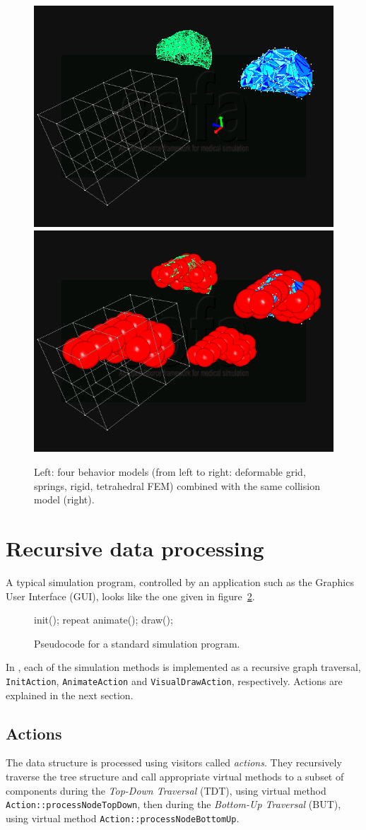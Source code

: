 \begin{figure}
 \centering
 \includegraphics[width=0.4\linewidth]{demoLiverFall1.png}
 \includegraphics[width=0.4\linewidth]{demoLiverFall2.png}
 \caption{Left: four behavior models (from left to right: deformable grid, springs, rigid, tetrahedral FEM) combined with the same collision model (right).}
 \label{fig:behaviormodels}
\end{figure}


\section{Recursive data processing}
A typical simulation program, controlled by an application such as the Graphics User Interface (GUI), looks like the one given in figure~\ref{pc:animationloop}.
\begin{figure}
\begin{code_cpp}
init();
repeat {
	animate();
	draw();
}
\end{code_cpp}
\caption{Pseudocode for a standard simulation program.}
\label{pc:animationloop}
\end{figure}
In \sofa, each of the simulation methods is implemented as a recursive graph traversal, \texttt{InitAction}, \texttt{AnimateAction} and \texttt{VisualDrawAction}, respectively. Actions are explained in the next section.

\subsection{Actions}
The data structure is processed using visitors called \emph{actions}. 
They recursively traverse the tree structure and call appropriate virtual methods to a subset of components during the \textit{Top-Down Traversal} (TDT), using virtual method \texttt{Action::processNodeTopDown}, then during the \textit{Bottom-Up Traversal} (BUT), using virtual method \texttt{Action::processNodeBottomUp}. 


